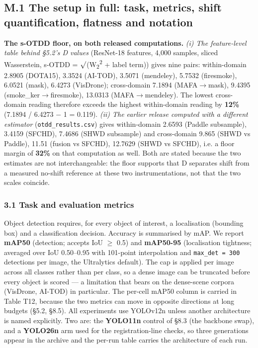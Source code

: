 \documentclass[pdflatex,sn-mathphys-ay]{sn-jnl}
\begin{document}
\subsection*{M.1 The setup in full: task, metrics, shift quantification, flatness and notation}

\textbf{The s-OTDD floor, on both released computations.} \emph{(i) The feature-level table behind \S{}5.2's D values} (ResNet-18 features, 4,000 samples, sliced Wasserstein, s-OTDD = \ensuremath{\surd}(W\textsubscript{2}\textsuperscript{2} + label term)) gives nine pairs: within-domain 2.8905 (DOTA15), 3.3524 (AI-TOD), 3.5071 (mendeley), 5.7532 (firesmoke), 6.0521 (mask), 6.4273 (VisDrone); cross-domain 7.1894 (MAFA\ensuremath{\rightarrow}mask), 9.4395 (smoke\_ker\ensuremath{\rightarrow}firesmoke), 13.0313 (MAFA\ensuremath{\rightarrow}mendeley). The lowest cross-domain reading therefore exceeds the highest within-domain reading by \textbf{12\%} (7.1894 / 6.4273 \ensuremath{-} 1 = 0.119). \emph{(ii) The earlier release computed with a different estimator} (\texttt{otdd\_results.csv}) gives within-domain 2.6593 (Paddle subsample), 3.4159 (SFCHD), 7.4686 (SHWD subsample) and cross-domain 9.865 (SHWD vs Paddle), 11.51 (fusion vs SFCHD), 12.7629 (SHWD vs SFCHD), i.e. a floor margin of \textbf{32\%} on that computation as well. Both are stated because the two estimates are not interchangeable: the floor supports that D separates shift from a measured no-shift reference at these two instrumentations, not that the two scales coincide.

\subsubsection*{3.1 Task and evaluation metrics}

Object detection requires, for every object of interest, a localisation (bounding box) and a classification decision. Accuracy is summarised by mAP. We report \textbf{mAP50} (detection; accepts IoU \ensuremath{\geq} 0.5) and \textbf{mAP50-95} (localisation tightness; averaged over IoU 0.50--0.95 with 101-point interpolation and \texttt{max\_det = 300} detections per image, the Ultralytics default). The cap is applied per image across all classes rather than per class, so a dense image can be truncated before every object is scored --- a limitation that bears on the dense-scene corpora (VisDrone, AI-TOD) in particular. The per-cell mAP50 column is carried in Table T12, because the two metrics can move in opposite directions at long budgets (\S{}5.2, \S{}8.5). All experiments use YOLOv12n \citep{kornblith2019} unless another architecture is named explicitly. Two are: the \textbf{YOLO11n} control of \S{}8.3 (the backbone swap), and a \textbf{YOLO26n} arm used for the registration-line checks, so three generations appear in the archive and the per-run table carries the architecture of each run.
\end{document}
